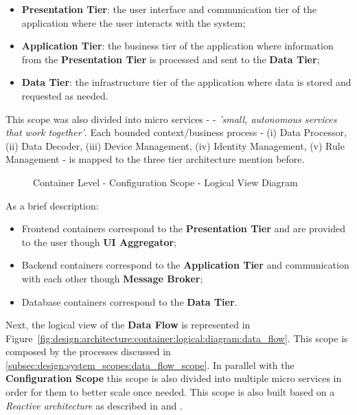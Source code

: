 \begin{itemize}
   \item \textbf{Presentation Tier}: the user interface and communication tier of the application where the user interacts with the system;
   \item \textbf{Application Tier}: the business tier of the application where information from the \textbf{Presentation Tier} is processed and sent to the \textbf{Data Tier};
   \item \textbf{Data Tier}: the infrastructure tier of the application where data is stored and requested as needed. 
\end{itemize}

This scope was also divided into micro services - \cite{newman2021building} - \textit{'small, autonomous services that work together'}. Each bounded context/business process - (i) Data Processor, (ii) Data Decoder, (iii) Device Management, (iv) Identity Management, (v) Rule Management - is mapped to the three tier architecture mention before.

\begin{landscape}
   \begin{figure}[H]
      \centering
   \resizebox{\columnwidth}{!}
   {      
      
   }
   \caption[Container Level - Configuration Scope - Logical View Diagram]{Container Level - Configuration Scope - Logical View Diagram}
      \label{fig:design:architecture:container:logical:diagram:configuration}
   \end{figure}
\end{landscape}

As a brief description:

\begin{itemize}
   \item Frontend containers correspond to the \textbf{Presentation Tier} and are provided to the user though \textbf{UI Aggregator};
   \item Backend containers correspond to the \textbf{Application Tier} and communication with each other though \textbf{Message Broker};
   \item Database containers correspond to the \textbf{Data Tier}.
\end{itemize}

Next, the logical view of the \textbf{Data Flow} is represented in Figure~\ref{fig:design:architecture:container:logical:diagram:data_flow}. This scope is composed by the processes discussed in \ref{subsec:design:system_scopes:data_flow_scope}. In parallel with the \textbf{Configuration Scope} this scope is also divided into multiple micro services in order for them to better scale once needed. This scope is also built based on a \textit{Reactive architecture} as described in \cite{reactivemanifesto} and \cite{reactivesystem}.  

